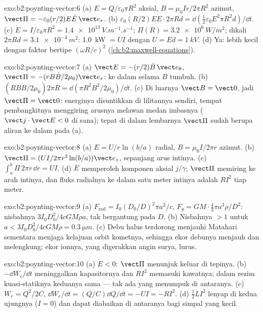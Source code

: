 \begin{solution}{exo:b2:poynting-vector:6}
(a) $E = Q/\varepsilon_0\pi R^2$ aksial, $B = \mu_0Ir/2\pi R^2$ azimut, $\vect\Pi = -\varepsilon_0
(r/2)E\dot E\,\vect e_r$. (b) $\varepsilon_0(R/2)E\dot E\cdot2\pi Rd = \dd(\tfrac12\varepsilon_0E^2\pi R^2d)/
\dd t$. (c) $\dot E = I/\varepsilon_0\pi R^2 = \qty{1.4e13}{V.m^{-1}.s^{-1}}$; $\Pi(R) = \qty{3.2e6}{W/m^2}$;
dikali $2\pi Rd = \qty{3.1e-4}{m^2}$: \qty{1.0}{kW} $= UI$ dengan $U = Ed = \qty{1}{kV}$. (d)
Ya: lebih kecil dengan faktor bertipe $(\omega R/c)^2$ (\cref{ch:b2:maxwell-equations}).
\end{solution}

\begin{solution}{exo:b2:poynting-vector:7}
(a) $\vect E = -(r/2)\dot B\,\vect e_\theta$, $\vect\Pi = -(rB\dot B/2\mu_0)\vect e_r$: ke dalam
selama $B$ tumbuh. (b) $(RB\dot B/2\mu_0)2\pi R = \dd(\pi R^2B^2/2\mu_0)/\dd t$. (c)
Di luarnya $\vect B = \vect 0$, jadi $\vect\Pi = \vect 0$: energinya disuntikkan di
lilitannya sendiri, tempat pembangkitnya menggiring arusnya melawan
medan imbasnya ($\vect j\cdot\vect E < 0$ di sana); tepat di dalam lembarnya
$\vect\Pi$ sudah berupa aliran ke dalam pada (a).
\end{solution}

\begin{solution}{exo:b2:poynting-vector:8}
(a) $E = U/r\ln(b/a)$ radial, $B = \mu_0I/2\pi r$ azimut. (b) $\vect\Pi = (UI/
2\pi r^2\ln(b/a))\vect e_z$, sepanjang arus intinya. (c) $\int_a^b\Pi\,2\pi r\,\dd r =
UI$. (d) $E$ memperoleh komponen aksial $j/\gamma$; $\vect\Pi$ memiring ke arah
intinya, dan fluks radialnya ke dalam satu meter intinya adalah $RI^2$ tiap meter.
\end{solution}

\begin{solution}{exo:b2:poynting-vector:9}
(a) $F_{\text{rad}} = I_0(D_0/D)^2\pi a^2/c$, $F_g = GM\cdot\tfrac43\pi a^3\rho/D^2$: nisbahnya
$3I_0D_0^2/4cGM\rho a$, tak bergantung pada $D$. (b) Nisbahnya $> 1$ untuk $a < 3I_0D_0^2/
4cGM\rho = \qty{0.3}{\micro m}$. (c) Debu halus terdorong menjauhi Matahari sementara
menjaga kelajuan orbit kometnya, sehingga ekor debunya menjauh dan
melengkung; ekor ionnya, yang digerakkan angin surya, lurus.
\end{solution}

\begin{solution}{exo:b2:poynting-vector:10}
(a) $\dot E < 0$: $\vect\Pi$ menunjuk keluar di tepinya. (b) $-\dd W_e/\dd t$
meninggalkan kapasitornya dan $RI^2$ memasuki kawatnya; dalam rezim kuasi-statiknya
keduanya sama --- tak ada yang menumpuk di antaranya. (c) $W_e =
Q^2/2C$, $\dd W_e/\dd t = (Q/C)\dd Q/\dd t = -UI = -RI^2$. (d) $\tfrac12LI^2$
lenyap di kedua ujungnya ($I = 0$) dan dapat diabaikan di antaranya bagi simpal
yang kecil.
\end{solution}

